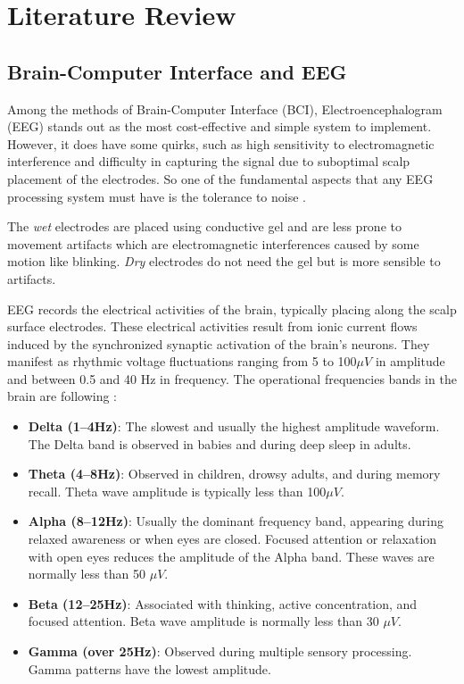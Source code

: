 \section{Literature Review}
	\label{sec:revBibli}
	
	\subsection{Brain-Computer Interface and EEG}
		\par Among the methods of Brain-Computer Interface (BCI), Electroencephalogram (EEG) stands out as the most cost-effective and simple system to implement. However, it does have some quirks, such as high sensitivity to electromagnetic interference and difficulty in capturing the signal due to suboptimal scalp placement of the electrodes. So one of the fundamental aspects that any EEG processing system must have is the tolerance to noise \cite{JALALYBIDGOLY2020101788}.
		
		\par The \textit{wet} electrodes are placed using conductive gel and are less prone to movement artifacts which are electromagnetic interferences caused by some motion like blinking. \textit{Dry} electrodes do not need the gel but is more sensible to artifacts.
		
		\par EEG records the electrical activities of the brain, typically placing along the scalp surface electrodes. These electrical activities result from ionic current flows induced by the synchronized synaptic activation of the brain's neurons. They manifest as rhythmic voltage fluctuations ranging from 5 to 100$\mu V$ in amplitude and between 0.5 and 40 Hz in frequency\cite{JALALYBIDGOLY2020101788}. The operational frequencies bands in the brain are following \cite{sanei2021eeg}:
		
		\begin{itemize}
			\item \textbf{Delta (1–4Hz)}: The slowest and usually the highest amplitude waveform. The Delta band is observed in babies and during deep sleep in adults.
			
			\item \textbf{Theta (4–8Hz)}: Observed in children, drowsy adults, and during memory recall. Theta wave amplitude is typically less than 100$\mu V$.
			
			\item \textbf{Alpha (8–12Hz)}: Usually the dominant frequency band, appearing during relaxed awareness or when eyes are closed. Focused attention or relaxation with open eyes reduces the amplitude of the Alpha band. These waves are normally less than 50 $\mu V$.
			
			\item \textbf{Beta (12–25Hz)}: Associated with thinking, active concentration, and focused attention. Beta wave amplitude is normally less than 30 $\mu V$.
			
			\item \textbf{Gamma (over 25Hz)}: Observed during multiple sensory processing. Gamma patterns have the lowest amplitude.
		\end{itemize}

